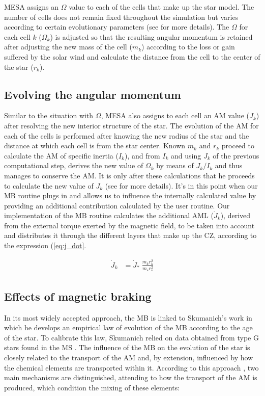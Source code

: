 \documentclass[fleqn,usenatbib]{mnras}
\begin{document}
MESA assigns an $\Omega$ value to each of the cells that make up the star model. The number of cells does not remain fixed throughout the simulation but varies according to certain evolutionary parameters (see \citet{Paxton2015} for more details). The $\Omega$ for each cell $k$ ($\Omega_k$) is adjusted so that the resulting angular momentum is retained after adjusting the new mass of the cell ($m_k$) according to the loss or gain suffered by the solar wind and calculate the distance from the cell to the center of the star ($r_k$).\par

\subsection{Evolving the angular momentum}
Similar to the situation with $\Omega$, MESA also assigns to each cell an AM value ($J_k$) after resolving the new interior structure of the star. The evolution of the AM for each of the cells is performed after knowing the new radius of the star and the distance at which each cell is from the star center. Known $m_k$ and $r_k$ proceed to calculate the AM of specific inertia ($I_k$), and from $I_k$ and using $J_k$ of the previous computational step, derives the new value of $\Omega_k$ by means of $J_k/I_k$ and thus manages to conserve the AM. It is only after these calculations that he proceeds to calculate the new value of $J_k$ (see \citet{Paxton2015} for more details). It's in this point when our MB routine plugs in and allows us to influence the internally calculated value by providing an additional contribution calculated by the user routine. Our implementation of the MB routine calculates the additional AML ($\Dot{J}_{k}$), derived from the external torque exerted by the magnetic field, to be taken into account and distributes it through the different layers that make up the CZ, according to the expression (\ref{eq:j_dot}.\par

\begin{ceqn}
\begin{align}
\Dot{J}_{k} &= \Dot{J}_*\;\frac{m^{}_{k} r^2_{k}}{m^{}_* r_*^2} \label{eq:k_jdot}
\end{align}
\end{ceqn}

\subsection{Effects of magnetic braking}
In its most widely accepted approach, the MB is linked to Skumanich's work in which he develops an empirical law of evolution of the MB according to the age of the star. To calibrate this law, Skumanich relied on data obtained from type G stars found in the MS \citep{Skumanich}. The influence of the MB on the evolution of the star is closely related to the transport of the AM and, by extension, influenced by how the chemical elements are transported within it. According to this approach \citep{Meynet2010}, two main mechanisms are distinguished, attending to how the transport of the AM is produced, which condition the mixing of these elements:
\end{document}
